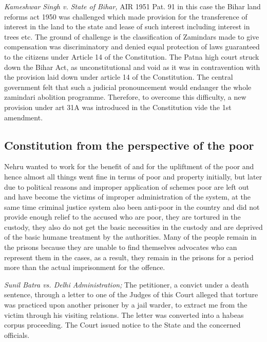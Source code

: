 \begin{multicols}{2}
\noi
\textit{Kameshwar Singh v. State of Bihar,} AIR 1951 Pat. 91 in this case the Bihar land reforms act 1950 was challenged which made provision for the transference of interest in the land to the state and lease of such interest including interest in trees etc. The ground of challenge is the classification of Zamindars made to give compensation was discriminatory and denied equal protection of laws guaranteed to the citizens under Article 14 of the Constitution. The Patna high court struck down the Bihar Act, as unconstitutional and void as it was in contravention with the provision laid down under article 14 of the Constitution. The central government felt that such a judicial pronouncement would endanger the whole zamindari abolition programme. Therefore, to overcome this difficulty, a new provision under art 31A was introduced in the Constitution vide the 1st amendment.

\vspace{-.3cm}

\subsection*{Constitution from the perspective of the poor}

\vspace{-.2cm}

\noi
Nehru wanted to work for the benefit of and for the upliftment of the poor and hence almost all things went fine in terms of poor and property initially, but later due to political reasons and improper application of schemes poor are left out and have become the victims of improper administration of the system, at the same time criminal justice system also been anti-poor in the country and did not provide enough relief to the accused who are poor, they are tortured in the custody, they also do not get the basic necessities in the custody and are deprived of the basic humane treatment by the authorities. Many of the people remain in the prisons because they are unable to find themselves advocates who can represent them in the cases, as a result, they remain in the prisons for a period more than the actual imprisonment for the offence.

\noi
\textit{Sunil Batra vs. Delhi Administration;} The petitioner, a convict under a death sentence, through a letter to one of the Judges of this Court alleged that torture was practiced upon another prisoner by a jail warder, to extract me from the victim through his visiting relations. The letter was converted into a habeas corpus proceeding. The Court issued notice to the State and the concerned officials.


\end{multicols}
